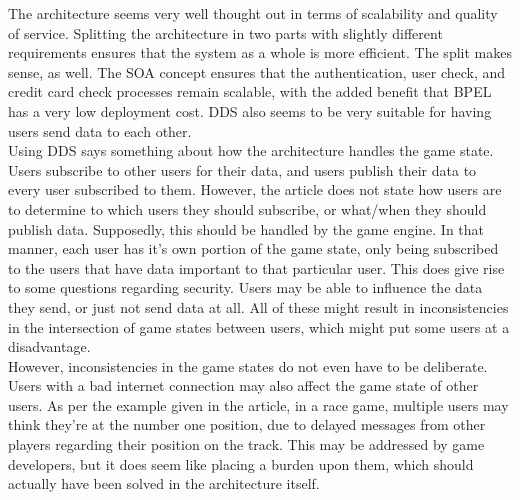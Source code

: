 The architecture seems very well thought out in terms of scalability and quality of service.
Splitting the architecture in two parts with slightly different requirements ensures that the system as a whole is more efficient.
The split makes sense, as well.
The SOA concept ensures that the authentication, user check, and credit card check processes remain scalable, with the added benefit that BPEL has a very low deployment cost.
DDS also seems to be very suitable for having users send data to each other. \\

Using DDS says something about how the architecture handles the game state.
Users subscribe to other users for their data, and users publish their data to every user subscribed to them.
However, the article does not state how users are to determine to which users they should subscribe, or what/when they should publish data.
Supposedly, this should be handled by the game engine.
In that manner, each user has it's own portion of the game state, only being subscribed to the users that have data important to that particular user.
This does give rise to some questions regarding security. 
Users may be able to influence the data they send, or just not send data at all. 
All of these might result in inconsistencies in the intersection of game states between users, which might put some users at a disadvantage.\\
However, inconsistencies in the game states do not even have to be deliberate.
Users with a bad internet connection may also affect the game state of other users. 
As per the example given in the article, in a race game, multiple users may think they're at the number one position, due to delayed messages from other players regarding their position on the track.
This may be addressed by game developers, but it does seem like placing a burden upon them, which should actually have been solved in the architecture itself. \\

